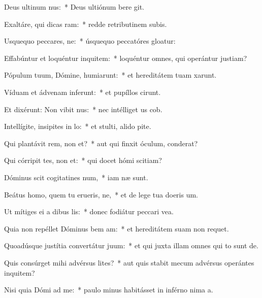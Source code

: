 \item Deus ultinum nus:~* Deus ultiónum bere git.
\item Exaltáre, qui dicas ram:~* redde retributinem subis.
\item Usquequo peccares, ne:~* úsquequo peccatóres gloatur:
\item Effabúntur et loquéntur inquitem:~* loquéntur omnes, qui operántur justiam?
\item Pópulum tuum, Dómine, humiarunt:~* et hereditátem tuam xarunt.
\item Víduam et ádvenam inferunt:~* et pupíllos cirunt.
\item Et dixérunt: Non vibit nus:~* nec intélliget us cob.
\item Intellígite, insipites in lo:~* et stulti, alido pite.
\item Qui plantávit rem, non et?~* aut qui finxit óculum,  conderat?
\item Qui córripit tes, non et:~* qui docet hómi scitiam?
\item Dóminus scit cogitatines num,~* iam næ sunt.
\item Beátus homo, quem tu erueris, ne,~* et de lege tua doeris um.
\item Ut mítiges ei a dibus lis:~* donec fodiátur peccari vea.
\item Quia non repéllet Dóminus bem am:~* et hereditátem suam non requet.
\item Quoadúsque justítia convertátur  juum:~* et qui juxta illam omnes qui to sunt de.
\item Quis consúrget mihi advérsus lites?~* aut quis stabit mecum advérsus operántes inquitem?
\item Nisi quia Dómi ad me:~* paulo minus habitásset in inférno nima a.
